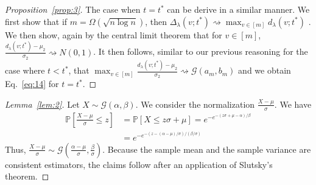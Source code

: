 \documentclass[draftcls]{IEEEtran}
\theoremstyle{definition}
\begin{document}
\begin{proof}[Proposition~\ref{prop:3}]
The case when $t = t^{*}$ can be
derive in a similar manner. We first show that if $m =
\Omega(\sqrt{n \log{n}})$, then $\Delta_{\lambda}(v;t^{*}) \rightsquigarrow
\max_{v \in [m]}{d_{\lambda}(v;t^{*})}$ \cite[Lemma
3.1]{rukhin:_limit_distr_graph_scan_statis}.  
We then show, again by the 
central limit theorem that for $v \in [m]$, $\tfrac{d_{\lambda}(v;t^{*}) -
  \mu_2}{\sigma_2} \rightsquigarrow N(0,1)$. It then follows, similar
to our previous reasoning for the case where $t < t^{*}$, that
$\max_{v \in [m]} \tfrac{d_{\lambda}(v;t^{*}) -
  \mu_2}{\sigma_2} \rightsquigarrow \mathcal{G}(a_m,b_m)$ and we obtain
Eq.~\eqref{eq:14} for $t = t^{*}$.  
\end{proof}
\begin{proof}[Lemma~\ref{lem:2}]
  Let $ X \sim \mathcal{G}(\alpha, \beta)$. We consider the
  normalization $\tfrac{X - \mu}{\sigma}$. We have
  \begin{equation*}
    \begin{split}
    \mathbb{P}[ \frac{X - \mu}{\sigma} \leq z]  &= \mathbb{P}[X \leq z
    \sigma + \mu] 
    = e^{-e^{-(z \sigma + \mu - \alpha)/\beta}} \\
      &= e^{- e^{-(z - (\alpha - \mu)/\sigma)/(\beta/\sigma)}}
    \end{split}
  \end{equation*}
  Thus, $\tfrac{X - \mu}{\sigma} \sim \mathcal{G}(\tfrac{\alpha -
    \mu}{\sigma}, \tfrac{\beta}{\sigma})$. Because the sample
  mean and the sample variance are consistent estimators, the claims
  follow after an application of Slutsky's theorem.
\end{proof}
\end{document}
